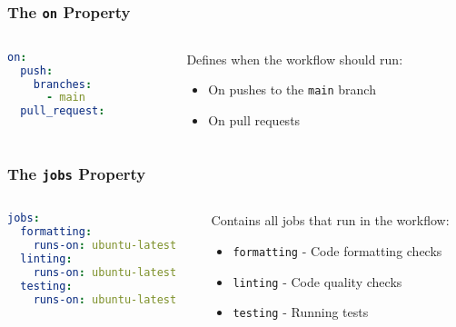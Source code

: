 \begin{frame}[fragile]
	\frametitle{The \texttt{on} Property}
	\begin{columns}
		\begin{column}{0.5\textwidth}
			\begin{lstlisting}[language=yaml,basicstyle=\small\ttfamily]
on:
  push:
    branches:
      - main
  pull_request:
			\end{lstlisting}
		\end{column}
		\begin{column}{0.5\textwidth}
			Defines when the workflow should run:
			\begin{itemize}
				\item On pushes to the \texttt{main} branch
				\item On pull requests
			\end{itemize}
		\end{column}
	\end{columns}
\end{frame}

\begin{frame}[fragile]
	\frametitle{The \texttt{jobs} Property}
	\begin{columns}
		\begin{column}{0.5\textwidth}
			\begin{lstlisting}[language=yaml,basicstyle=\small\ttfamily]
jobs:
  formatting:
    runs-on: ubuntu-latest
  linting:
    runs-on: ubuntu-latest
  testing:
    runs-on: ubuntu-latest
			\end{lstlisting}
		\end{column}
		\begin{column}{0.5\textwidth}
			Contains all jobs that run in the workflow:
			\begin{itemize}
				\item \texttt{formatting} - Code formatting checks
				\item \texttt{linting} - Code quality checks
				\item \texttt{testing} - Running tests
			\end{itemize}
		\end{column}
	\end{columns}
\end{frame}

